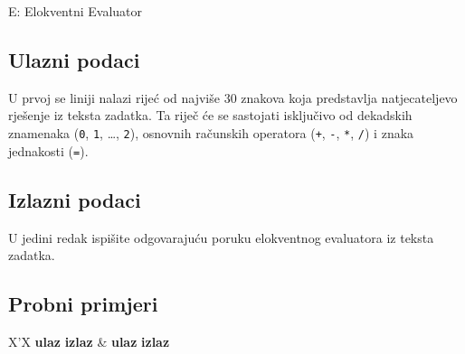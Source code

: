 \begin{statement}[
  timelimit=1 s,
  memorylimit=512 MiB,
]{E: Elokventni Evaluator}
\subsection*{Ulazni podaci}
U prvoj se liniji nalazi rijeć od najviše $30$ znakova koja predstavlja
natjecateljevo rješenje iz teksta zadatka. Ta riječ će se sastojati isključivo
od dekadskih znamenaka (\texttt{0}, \texttt{1}, \dots, \texttt{2}), osnovnih
računskih operatora (\texttt{+}, \texttt{-}, \texttt{*}, \texttt{/}) i znaka
jednakosti (\texttt{=}).

\subsection*{Izlazni podaci}
U jedini redak ispišite odgovarajuću poruku elokventnog evaluatora iz
teksta zadatka.

\subsection*{Probni primjeri}
  \begin{tabularx}{\textwidth}{X'X}
  \textbf{ulaz}
  \linespread{1}{}
  \textbf{izlaz}
  \linespread{1}{} &
  \textbf{ulaz}
  \linespread{1}{}
  \textbf{izlaz}
  \linespread{1}{}
\end{tabularx}

\end{statement}


